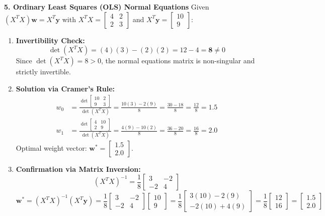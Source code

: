 \textbf{5. Ordinary Least Squares (OLS) Normal Equations}
Given $(X^T X)\mathbf{w} = X^T \mathbf{y}$ with $X^T X = \begin{bmatrix} 4 & 2 \\ 2 & 3 \end{bmatrix}$ and $X^T \mathbf{y} = \begin{bmatrix} 10 \\ 9 \end{bmatrix}$:
\begin{enumerate}
    \item \textbf{Invertibility Check:}
    \begin{equation*}
    \det(X^T X) = (4)(3) - (2)(2) = 12 - 4 = \mathbf{8} \neq 0
    \end{equation*}
    Since $\det(X^T X) = 8 > 0$, the normal equations matrix is non-singular and strictly invertible.
    \item \textbf{Solution via Cramer's Rule:}
    \begin{align*}
    w_0 &= \frac{\det \begin{bmatrix} 10 & 2 \\ 9 & 3 \end{bmatrix}}{\det(X^T X)} = \frac{10(3) - 2(9)}{8} = \frac{30 - 18}{8} = \frac{12}{8} = \mathbf{1.5} \\
    w_1 &= \frac{\det \begin{bmatrix} 4 & 10 \\ 2 & 9 \end{bmatrix}}{\det(X^T X)} = \frac{4(9) - 10(2)}{8} = \frac{36 - 20}{8} = \frac{16}{8} = \mathbf{2.0}
    \end{align*}
    Optimal weight vector: $\mathbf{w}^* = \mathbf{\begin{bmatrix} 1.5 \\ 2.0 \end{bmatrix}}$.
    \item \textbf{Confirmation via Matrix Inversion:}
    \begin{equation*}
    (X^T X)^{-1} = \frac{1}{8} \begin{bmatrix} 3 & -2 \\ -2 & 4 \end{bmatrix}
    \end{equation*}
    \begin{equation*}
    \mathbf{w}^* = (X^T X)^{-1} (X^T \mathbf{y}) = \frac{1}{8} \begin{bmatrix} 3 & -2 \\ -2 & 4 \end{bmatrix} \begin{bmatrix} 10 \\ 9 \end{bmatrix} = \frac{1}{8} \begin{bmatrix} 3(10) - 2(9) \\ -2(10) + 4(9) \end{bmatrix} = \frac{1}{8} \begin{bmatrix} 12 \\ 16 \end{bmatrix} = \mathbf{\begin{bmatrix} 1.5 \\ 2.0 \end{bmatrix}}

\end{equation*}
\end{enumerate}
